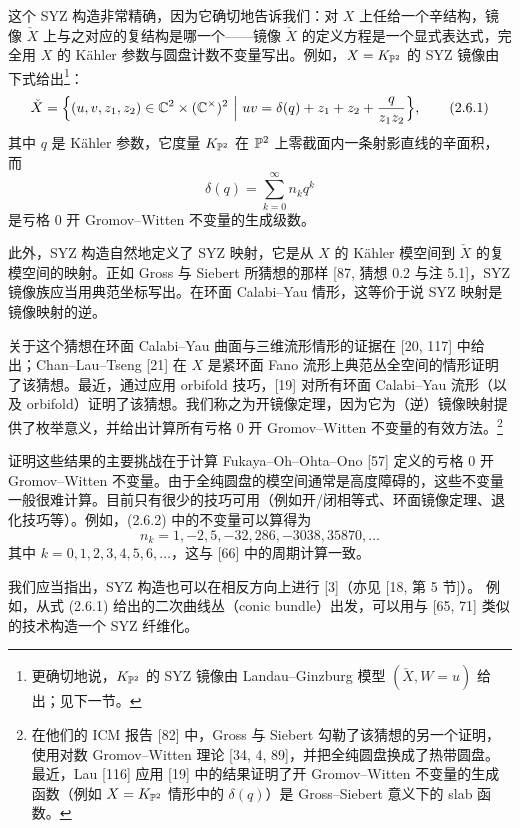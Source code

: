 这个 SYZ 构造非常精确，因为它确切地告诉我们：对 $X$ 上任给一个辛结构，镜像 $\check X$ 上与之对应的复结构是哪一个------镜像 $\check X$ 的定义方程是一个显式表达式，完全用 $X$ 的 Kähler 参数与圆盘计数不变量写出。例如，$X=K_{\mathbb{P}^2}$ 的 SYZ 镜像由下式给出\footnote{更确切地说，$K_{\mathbb{P}^2}$ 的 SYZ 镜像由 Landau--Ginzburg 模型 $(\check X,W=u)$ 给出；见下一节。}：
\begin{equation}
\check X=\Bigl\{(u,v,z_1,z_2)\in\C^2\times(\C^\times)^2\ \Big|\ uv=\delta(q)+z_1+z_2+\frac{q}{z_1z_2}\Bigr\},
\tag{2.6.1}
\end{equation}
其中 $q$ 是 Kähler 参数，它度量 $K_{\mathbb{P}^2}$ 在 $\mathbb{P}^2$ 上零截面内一条射影直线的辛面积，而
\begin{equation}
\delta(q)=\sum_{k=0}^{\infty}n_kq^k
\tag{2.6.2}
\end{equation}
是亏格 0 开 Gromov--Witten 不变量的生成级数。

此外，SYZ 构造自然地定义了 SYZ 映射，它是从 $X$ 的 Kähler 模空间到 $\check X$ 的复模空间的映射。正如 Gross 与 Siebert 所猜想的那样 [87, 猜想 0.2 与注 5.1]，SYZ 镜像族应当用典范坐标写出。在环面 Calabi--Yau 情形，这等价于说 SYZ 映射是镜像映射的逆。

关于这个猜想在环面 Calabi--Yau 曲面与三维流形情形的证据在 [20, 117] 中给出；Chan--Lau--Tseng [21] 在 $X$ 是紧环面 Fano 流形上典范丛全空间的情形证明了该猜想。最近，通过应用 orbifold 技巧，[19] 对所有环面 Calabi--Yau 流形（以及 orbifold）证明了该猜想。我们称之为开镜像定理，因为它为（逆）镜像映射提供了枚举意义，并给出计算所有亏格 0 开 Gromov--Witten 不变量的有效方法。\footnote{在他们的 ICM 报告 [82] 中，Gross 与 Siebert 勾勒了该猜想的另一个证明，使用对数 Gromov--Witten 理论 [34, 4, 89]，并把全纯圆盘换成了热带圆盘。最近，Lau [116] 应用 [19] 中的结果证明了开 Gromov--Witten 不变量的生成函数（例如 $X=K_{\mathbb{P}^2}$ 情形中的 $\delta(q)$）是 Gross--Siebert 意义下的 slab 函数。}

证明这些结果的主要挑战在于计算 Fukaya--Oh--Ohta--Ono [57] 定义的亏格 0 开 Gromov--Witten 不变量。由于全纯圆盘的模空间通常是高度障碍的，这些不变量一般很难计算。目前只有很少的技巧可用（例如开/闭相等式、环面镜像定理、退化技巧等）。例如，(2.6.2) 中的不变量可以算得为
\[
n_k=1,-2,5,-32,286,-3038,35870,\dots
\]
其中 $k=0,1,2,3,4,5,6,\dots$，这与 [66] 中的周期计算一致。

我们应当指出，SYZ 构造也可以在相反方向上进行 [3]（亦见 [18, 第 5 节]）。
例如，从式 (2.6.1) 给出的二次曲线丛（conic bundle）出发，可以用与 [65, 71] 类似的技术构造一个 SYZ 纤维化。
